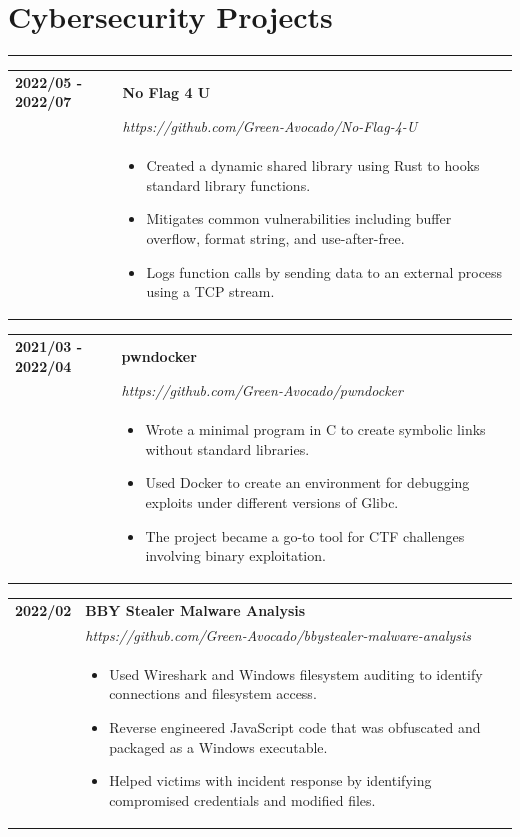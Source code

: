 \documentclass[letterpaper]{article}
\newcommand{\sectcolor}{cyan}
\newcommand{\sect}[1]{\section*{#1}
                        {\color{\sectcolor}
                        \rule{\textwidth}{1pt}
                        \vspace{-7pt}}}
\begin{document}
    \sect{Cybersecurity Projects}

        \begin{tabular}{p{} p{}}
            \textbf{2022/05 - 2022/07} & \textbf{No Flag 4 U} \\
            & \emph{https://github.com/Green-Avocado/No-Flag-4-U} \\
            & \begin{itemize}
                \item Created a dynamic shared library using Rust to hooks standard library functions.
                \item Mitigates common vulnerabilities including buffer overflow, format string, and
                    use-after-free.
                \item Logs function calls by sending data to an external process using a TCP stream.
            \end{itemize}
        \end{tabular}

        \begin{tabular}{p{} p{}}
            \textbf{2021/03 - 2022/04} & \textbf{pwndocker} \\
            & \emph{https://github.com/Green-Avocado/pwndocker} \\
            & \begin{itemize}
                \item Wrote a minimal program in C to create symbolic links without standard libraries.
                \item Used Docker to create an environment for debugging exploits under different
                    versions of Glibc.
                \item The project became a go-to tool for CTF challenges involving binary exploitation.
            \end{itemize}
        \end{tabular}

        \begin{tabular}{p{} p{}}
            \textbf{2022/02} & \textbf{BBY Stealer Malware Analysis} \\
            & \emph{https://github.com/Green-Avocado/bbystealer-malware-analysis} \\
            & \begin{itemize}
                \item Used Wireshark and Windows filesystem auditing to identify connections and
                    filesystem access.
                \item Reverse engineered JavaScript code that was obfuscated and packaged as a Windows
                    executable.
                \item Helped victims with incident response by identifying compromised credentials and
                    modified files.
            \end{itemize}
        \end{tabular}
\end{document}
